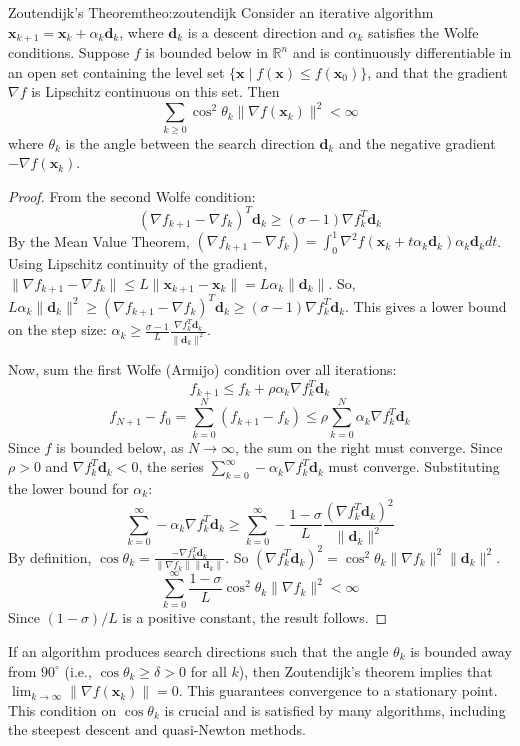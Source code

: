 \documentclass{MathNote}
\begin{document}
\begin{theorem}{Zoutendijk's Theorem}{theo:zoutendijk}
	Consider an iterative algorithm $\bm{x}_{k+1} = \bm{x}_k + \alpha_k \bm{d}_k$, where $\bm{d}_k$ is a descent direction and $\alpha_k$ satisfies the Wolfe conditions. Suppose $f$ is bounded below in $\mathbb{R}^n$ and is continuously differentiable in an open set containing the level set $\{\bm{x} \mid f(\bm{x}) \le f(\bm{x}_0)\}$, and that the gradient $\nabla f$ is Lipschitz continuous on this set. Then
	$$
	\sum_{k \ge 0} \cos^2 \theta_k \|\nabla f(\bm{x}_k)\|^2 < \infty
	$$
	where $\theta_k$ is the angle between the search direction $\bm{d}_k$ and the negative gradient $-\nabla f(\bm{x}_k)$.
\end{theorem}
\begin{proof}
	From the second Wolfe condition:
	$$ (\nabla f_{k+1} - \nabla f_k)^T \bm{d}_k \ge (\sigma - 1) \nabla f_k^T \bm{d}_k $$
	By the Mean Value Theorem, $(\nabla f_{k+1} - \nabla f_k) = \int_0^1 \nabla^2 f(\bm{x}_k+t\alpha_k \bm{d}_k) \alpha_k \bm{d}_k dt$.
	Using Lipschitz continuity of the gradient, $\|\nabla f_{k+1} - \nabla f_k\| \le L \|\bm{x}_{k+1} - \bm{x}_k\| = L \alpha_k \|\bm{d}_k\|$.
	So, $L \alpha_k \|\bm{d}_k\|^2 \ge (\nabla f_{k+1} - \nabla f_k)^T \bm{d}_k \ge (\sigma-1) \nabla f_k^T \bm{d}_k$.
	This gives a lower bound on the step size: $\alpha_k \ge \frac{\sigma-1}{L} \frac{\nabla f_k^T \bm{d}_k}{\|\bm{d}_k\|^2}$.
	
	Now, sum the first Wolfe (Armijo) condition over all iterations:
	$$ f_{k+1} \le f_k + \rho \alpha_k \nabla f_k^T \bm{d}_k $$
	$$ f_{N+1} - f_0 = \sum_{k=0}^N (f_{k+1} - f_k) \le \rho \sum_{k=0}^N \alpha_k \nabla f_k^T \bm{d}_k $$
	Since $f$ is bounded below, as $N \to \infty$, the sum on the right must converge. Since $\rho>0$ and $\nabla f_k^T \bm{d}_k < 0$, the series $\sum_{k=0}^\infty -\alpha_k \nabla f_k^T \bm{d}_k$ must converge.
	Substituting the lower bound for $\alpha_k$:
	$$ \sum_{k=0}^{\infty} -\alpha_k \nabla f_k^T \bm{d}_k \ge \sum_{k=0}^{\infty} -\frac{1-\sigma}{L} \frac{(\nabla f_k^T \bm{d}_k)^2}{\|\bm{d}_k\|^2} $$
	By definition, $\cos \theta_k = \frac{-\nabla f_k^T \bm{d}_k}{\|\nabla f_k\| \|\bm{d}_k\|}$. So $(\nabla f_k^T \bm{d}_k)^2 = \cos^2 \theta_k \|\nabla f_k\|^2 \|\bm{d}_k\|^2$.
	$$ \sum_{k=0}^{\infty} \frac{1-\sigma}{L} \cos^2 \theta_k \|\nabla f_k\|^2 < \infty $$
	Since $(1-\sigma)/L$ is a positive constant, the result follows.
\end{proof}

\begin{corollary}\label{cor:convergence}
	If an algorithm produces search directions such that the angle $\theta_k$ is bounded away from $90^\circ$ (i.e., $\cos \theta_k \ge \delta > 0$ for all $k$), then Zoutendijk's theorem implies that $\lim_{k \to \infty} \|\nabla f(\bm{x}_k)\| = 0$. This guarantees convergence to a stationary point. This condition on $\cos \theta_k$ is crucial and is satisfied by many algorithms, including the steepest descent and quasi-Newton methods.
\end{corollary}
\end{document}
